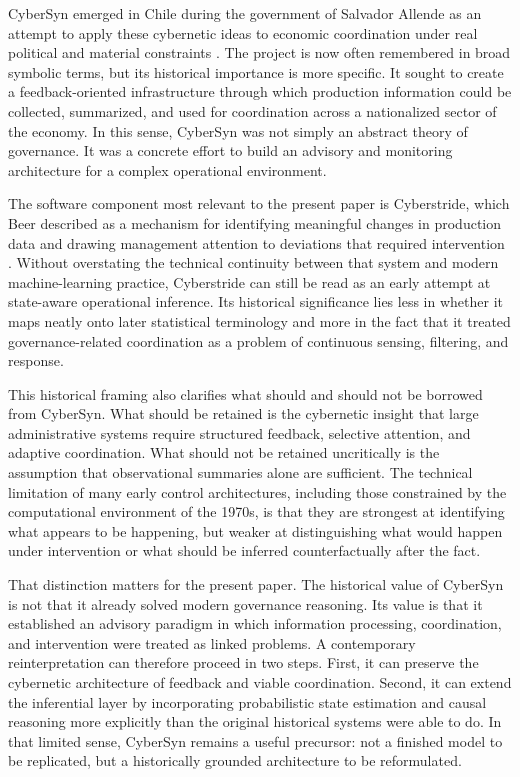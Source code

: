 \documentclass[11pt]{article}
\begin{document}
CyberSyn emerged in Chile during the government of Salvador Allende as an attempt to apply these cybernetic ideas to economic coordination under real political and material constraints \citep{medina2014}. The project is now often remembered in broad symbolic terms, but its historical importance is more specific. It sought to create a feedback-oriented infrastructure through which production information could be collected, summarized, and used for coordination across a nationalized sector of the economy. In this sense, CyberSyn was not simply an abstract theory of governance. It was a concrete effort to build an advisory and monitoring architecture for a complex operational environment.

The software component most relevant to the present paper is Cyberstride, which Beer described as a mechanism for identifying meaningful changes in production data and drawing management attention to deviations that required intervention \citep{beer1972, medina2014}. Without overstating the technical continuity between that system and modern machine-learning practice, Cyberstride can still be read as an early attempt at state-aware operational inference. Its historical significance lies less in whether it maps neatly onto later statistical terminology and more in the fact that it treated governance-related coordination as a problem of continuous sensing, filtering, and response.

This historical framing also clarifies what should and should not be borrowed from CyberSyn. What should be retained is the cybernetic insight that large administrative systems require structured feedback, selective attention, and adaptive coordination. What should not be retained uncritically is the assumption that observational summaries alone are sufficient. The technical limitation of many early control architectures, including those constrained by the computational environment of the 1970s, is that they are strongest at identifying what appears to be happening, but weaker at distinguishing what would happen under intervention or what should be inferred counterfactually after the fact.

That distinction matters for the present paper. The historical value of CyberSyn is not that it already solved modern governance reasoning. Its value is that it established an advisory paradigm in which information processing, coordination, and intervention were treated as linked problems. A contemporary reinterpretation can therefore proceed in two steps. First, it can preserve the cybernetic architecture of feedback and viable coordination. Second, it can extend the inferential layer by incorporating probabilistic state estimation and causal reasoning more explicitly than the original historical systems were able to do. In that limited sense, CyberSyn remains a useful precursor: not a finished model to be replicated, but a historically grounded architecture to be reformulated.
\end{document}
